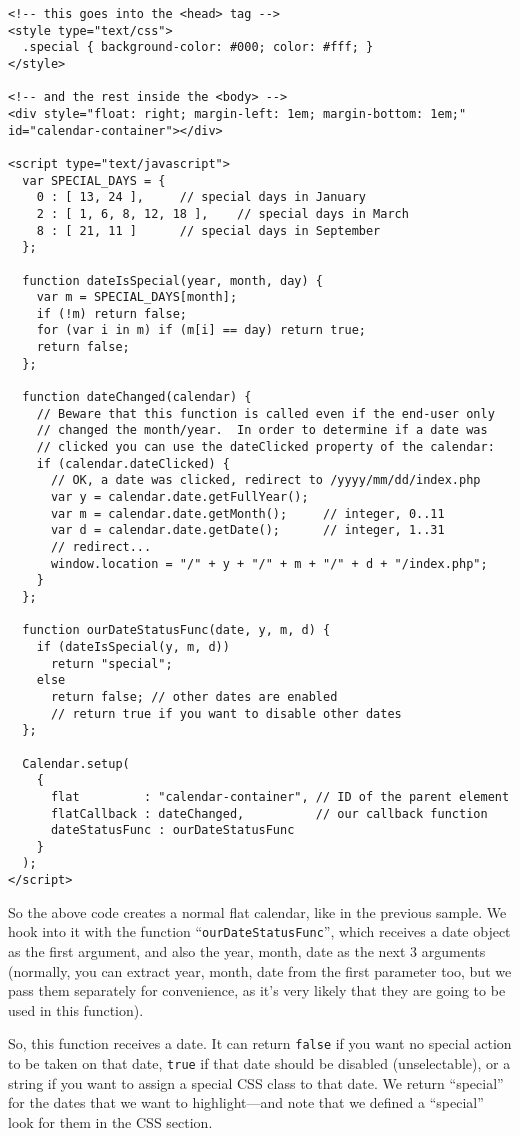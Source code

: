 \documentclass[a4paper,twoside,10pt]{dynadoc}
\begin{document}
\begin{verbatim}
<!-- this goes into the <head> tag -->
<style type="text/css">
  .special { background-color: #000; color: #fff; }
</style>

<!-- and the rest inside the <body> -->
<div style="float: right; margin-left: 1em; margin-bottom: 1em;"
id="calendar-container"></div>

<script type="text/javascript">
  var SPECIAL_DAYS = {
    0 : [ 13, 24 ],		// special days in January
    2 : [ 1, 6, 8, 12, 18 ],	// special days in March
    8 : [ 21, 11 ]		// special days in September
  };

  function dateIsSpecial(year, month, day) {
    var m = SPECIAL_DAYS[month];
    if (!m) return false;
    for (var i in m) if (m[i] == day) return true;
    return false;
  };

  function dateChanged(calendar) {
    // Beware that this function is called even if the end-user only
    // changed the month/year.  In order to determine if a date was
    // clicked you can use the dateClicked property of the calendar:
    if (calendar.dateClicked) {
      // OK, a date was clicked, redirect to /yyyy/mm/dd/index.php
      var y = calendar.date.getFullYear();
      var m = calendar.date.getMonth();     // integer, 0..11
      var d = calendar.date.getDate();      // integer, 1..31
      // redirect...
      window.location = "/" + y + "/" + m + "/" + d + "/index.php";
    }
  };

  function ourDateStatusFunc(date, y, m, d) {
    if (dateIsSpecial(y, m, d))
      return "special";
    else
      return false; // other dates are enabled
      // return true if you want to disable other dates
  };

  Calendar.setup(
    {
      flat         : "calendar-container", // ID of the parent element
      flatCallback : dateChanged,          // our callback function
      dateStatusFunc : ourDateStatusFunc
    }
  );
</script>
\end{verbatim}

So the above code creates a normal flat calendar, like in the previous
sample.  We hook into it with the function “\texttt{ourDateStatusFunc}”,
which receives a date object as the first argument, and also the year,
month, date as the next 3 arguments (normally, you can extract year, month,
date from the first parameter too, but we pass them separately for
convenience, as it's very likely that they are going to be used in this
function).

So, this function receives a date.  It can return \texttt{false} if you want
no special action to be taken on that date, \texttt{true} if that date
should be disabled (unselectable), or a string if you want to assign a
special CSS class to that date.  We return “special” for the dates that we
want to highlight---and note that we defined a “special” look for them in
the CSS section.
\end{document}
